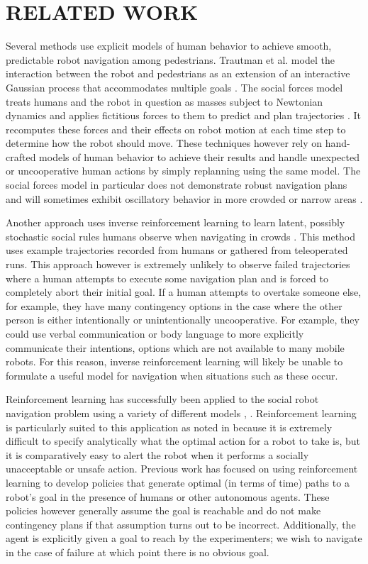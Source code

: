 \documentclass[letterpaper, 10 pt, conference]{ieeeconf}  %
\begin{document}
\section{RELATED WORK}\label{sec:relatedwork}
	Several methods use explicit models of human behavior to achieve smooth, predictable robot navigation among pedestrians. Trautman et al. model the interaction between the robot and pedestrians as an extension of an interactive Gaussian process that accommodates multiple goals \cite{caseforcoop}. The social forces model treats humans and the robot in question as masses subject to Newtonian dynamics and applies fictitious forces to them to predict and plan trajectories \cite{sfm}. It recomputes these forces and their effects on robot motion at each time step to determine how the robot should move. These techniques however rely on hand-crafted models of human behavior to achieve their results and handle unexpected or uncooperative human actions by simply replanning using the same model. The social forces model in particular does not demonstrate robust navigation plans and will sometimes exhibit oscillatory behavior in more crowded or narrow areas \cite{sfm}.
	
	Another approach uses inverse reinforcement learning to learn latent, possibly stochastic social rules humans observe when navigating in crowds \cite{socialirl}. This method uses example trajectories recorded from humans or gathered from teleoperated runs. This approach however is extremely unlikely to observe failed trajectories where a human attempts to execute some navigation plan and is forced to completely abort their initial goal. If a human attempts to overtake someone else, for example, they have many contingency options in the case where the other person is either intentionally or unintentionally uncooperative. For example, they could use verbal communication or body language to more explicitly communicate their intentions, options which are not available to many mobile robots. For this reason, inverse reinforcement learning will likely be unable to formulate a useful model for navigation when situations such as these occur.
	
	Reinforcement learning has successfully been applied to the social robot navigation problem using a variety of different models \cite{sociallyawarerl}, \cite{crowdawarerl}. Reinforcement learning is particularly suited to this application as noted in \cite{sociallyawarerl} because it is extremely difficult to specify analytically what the optimal action for a robot to take is, but it is comparatively easy to alert the robot when it performs a socially unacceptable or unsafe action. Previous work has focused on using reinforcement learning to develop policies that generate optimal (in terms of time) paths to a robot's goal in the presence of humans or other autonomous agents. These policies however generally assume the goal is reachable and do not make contingency plans if that assumption turns out to be incorrect. Additionally, the agent is explicitly given a goal to reach by the experimenters; we wish to navigate in the case of failure at which point there is no obvious goal.
	
\end{document}
